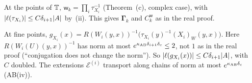 \begin{detail}
\begin{step}
At the points of $\mathbb T$, $\mathsf w_k=\prod_i\tau_{X_i}^{-1}$ (Theorem~(c), complex case), with $\lvert\ell(\tau_{X_i})\rvert\le C\delta_{i+1}\lvert A\rvert$ by~(ii). This gives $\boldsymbol\Gamma_k$ and $C^{\mathsf w}_k$ as in the real proof.

At fine points, $g_{X_i}(x)=R(W_i(y,x))^{-1}\big(\tau_{X_i}(y)^{-1}(X_i)_W(y,x)\big)$. Here $R(W_i(U)(y,x))^{-1}$ has norm at most $e^{\kappa_{\rm AB}\delta_{i+1}\delta_c}\le2$, not $1$ as in the real proof (``conjugation does not change the norm''). So $\lvert\ell(g_{X_i}(x))\rvert\le C\delta_{i+1}\lvert A\rvert$, with $C$ doubled. The extensions $\mathcal E^{(i)}$ transport along chains of norm at most $e^{\kappa_{\rm AB}\delta_c}$ (AB(iv)).
\end{step}
\end{detail}

